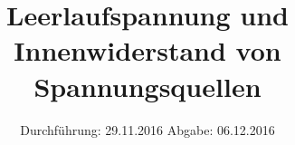 

\subject{V. 301}
\title{Leerlaufspannung und Innenwiderstand von Spannungsquellen}
\date{
\centering
  Durchführung: 29.11.2016
  \hspace{3em}
  Abgabe: 06.12.2016
}



\maketitle
\thispagestyle{empty}
\tableofcontents
\newpage








\printbibliography


